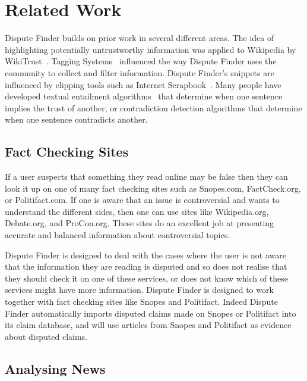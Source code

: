 \documentclass{www2010-submission}
\newcommand{\todo}[1]{}
\begin{document}
\todo{Should we explicitly list what we think are our key contributions?}


\section{Related Work}

Dispute Finder builds on prior work in several different areas. The idea of highlighting potentially untrustworthy information was applied to Wikipedia by WikiTrust~\cite{Adler2008a}. Tagging Systems~\cite{Marlow2006} influenced the way Dispute Finder uses the community to collect and filter information. Dispute Finder's snippets are influenced by clipping tools such as Internet Scrapbook~\cite{Sugiura1998}. Many people have developed textual entailment algorithms~\cite{entail?} that determine when one sentence implies the trust of another, or contradiction detection algorithms that determine when one sentence contradicts another.

\todo{Add more references from the NewsCube paper}


\subsection{Fact Checking Sites}

If a user suspects that something they read online may be false then they can look it up on one of many fact checking sites such as Snopes.com, FactCheck.org, or Politifact.com. If one is aware that an issue is controversial and wants to understand the different sides, then one can use sites like Wikipedia.org, Debate.org, and ProCon.org. These sites do an excellent job at presenting accurate and balanced information about controversial topics. 

Dispute Finder is designed to deal with the cases where the user is not aware that the information they are reading is disputed and so does not realise that they should check it on one of these services, or does not know which of these services might have more information. Dispute Finder is designed to work together with fact checking sites like Snopes and Politifact. Indeed Dispute Finder automatically imports disputed claims made on Snopes or Politifact into its claim database, and will use articles from Snopes and Politifact as evidence about disputed claims.


\subsection{Analysing News}
\end{document}
